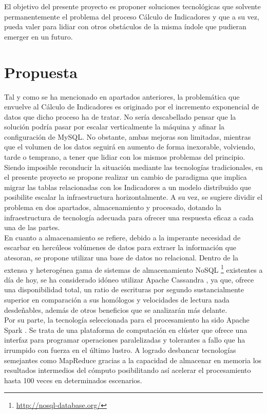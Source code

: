 El objetivo del presente proyecto es proponer soluciones tecnológicas que solvente permanentemente el problema del proceso Cálculo de Indicadores y que a su vez, pueda valer para lidiar con otros obstáculos de la misma índole que pudieran emerger en un futuro.\\

\section{Propuesta}

Tal y como se ha mencionado en apartados anteriores, la problemática que envuelve al Cálculo de Indicadores es originado por el incremento exponencial de datos que dicho proceso ha de tratar. No sería descabellado pensar que la solución podría pasar por escalar verticalmente la máquina y afinar la configuración de MySQL. No obstante, ambas mejoras son limitadas, mientras que el volumen de los datos seguirá en aumento de forma inexorable, volviendo, tarde o temprano, a tener que lidiar con los mismos problemas del principio.\\

Siendo imposible reconducir la situación mediante las tecnologías tradicionales, en el presente proyecto se propone realizar un cambio de paradigma que implica migrar las tablas relacionadas con los Indicadores a un modelo distribuido que posibilite escalar la infraestructura horizontalmente. A su vez, se sugiere dividir el problema en dos apartados, almacenamiento y procesado, dotando la infraestructura de tecnología adecuada para ofrecer una respuesta eficaz a cada una de las partes.\\

En cuanto a almacenamiento se refiere, debido a la imperante necesidad de escarbar en hercúleos volúmenes de datos para extraer la información que atesoran, se propone utilizar una base de datos no relacional. Dentro de la extensa y heterogénea gama de sistemas de almacenamiento NoSQL \footnote{\url{http://nosql-database.org/}} existentes a día de hoy, se ha considerado idóneo utilizar Apache Cassandra \cite{lakshman2010cassandra}, ya que, ofrece una disponibilidad total, un ratio de escrituras por segundo sustancialmente superior en comparación a sus homólogos \cite{rabl2012solving} y velocidades de lectura nada desdeñables, además de otros beneficios que se analizarán más delante.\\

Por su parte, la tecnología seleccionada para el procesamiento ha sido Apache Spark \cite{zaharia2010spark}. Se trata de una plataforma de computación en clúster que ofrece una interfaz para programar operaciones paralelizadas y tolerantes a fallo que ha irrumpido con fuerza en el último lustro. A logrado desbancar tecnologías semejantes como MapReduce \cite{dean2008mapreduce} gracias a la capacidad de almacenar en memoria los resultados intermedios del cómputo posibilitando así acelerar el procesamiento hasta 100 veces \cite{xin2013shark} en determinados escenarios.\\

